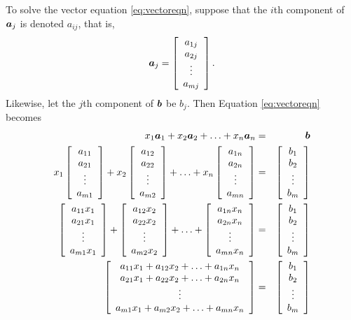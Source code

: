 To solve the vector equation \eqref{eq:vectoreqn}, suppose that the $i$th component of $\bb a_j$ is denoted $a_{ij}$, that is, 
\[\bb a_j = \mtx{c}{a_{1j} \\a_{2j} \\ \vdots\\ a_{mj}}.\] Likewise, let the $j$th component of $\bb b$ be $b_j$. Then Equation \eqref{eq:vectoreqn} becomes
\begin{eqnarray*} 
x_1\bb a_1 + x_2\bb a_2 + \ldots + x_n\bb a_n &=& \bb b\\
x_1\mtx{c}{a_{11} \\a_{21} \\ \vdots\\ a_{m1}} + x_2\mtx{c}{a_{12} \\a_{22} \\ \vdots\\ a_{m2}} + \ldots + x_n\mtx{c}{a_{1n} \\a_{2n} \\ \vdots\\ a_{mn}} &=& \mtx{c}{b_1\\b_2\\\vdots\\ b_m}\\
\mtx{c}{a_{11}x_1 \\a_{21}x_1 \\ \vdots\\ a_{m1}x_1} + \mtx{c}{a_{12}x_2 \\a_{22}x_2 \\ \vdots\\ a_{m2}x_2} + \ldots + \mtx{c}{a_{1n}x_n \\a_{2n}x_n \\ \vdots\\ a_{mn}x_n} &=& \mtx{c}{b_1\\b_2\\\vdots\\ b_m}\\
\mtx{c}{a_{11}x_1 + a_{12}x_2 + \ldots + a_{1n}x_n \\ a_{21}x_1 + a_{22}x_2 + \ldots + a_{2n}x_n \\ \vdots \\ a_{m1}x_1 + a_{m2}x_2 + \ldots + a_{mn}x_n}  &=& \mtx{c}{b_1\\b_2\\\vdots\\ b_m}\\
\end{eqnarray*} 

